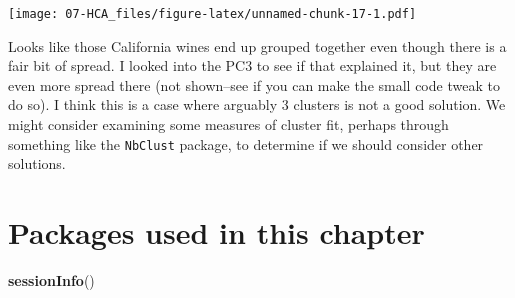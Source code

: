 \documentclass[
]{book}
\newenvironment{Shaded}{\begin{snugshade}}{\end{snugshade}}
\newcommand{\FunctionTok}[1]{\textcolor[rgb]{0.13,0.29,0.53}{\textbf{#1}}}
\newcommand{\NormalTok}[1]{#1}
\begin{document}
\texttt{[image: 07-HCA\_files/figure-latex/unnamed-chunk-17-1.pdf]}

Looks like those California wines end up grouped together even though there is a fair bit of spread. I looked into the PC3 to see if that explained it, but they are even more spread there (not shown--see if you can make the small code tweak to do so). I think this is a case where arguably 3 clusters is not a good solution. We might consider examining some measures of cluster fit, perhaps through something like the \texttt{NbClust} package, to determine if we should consider other solutions.

\section{Packages used in this chapter}\label{packages-used-in-this-chapter-6}

\begin{Shaded}
\begin{Highlighting}[]
\FunctionTok{sessionInfo}\NormalTok{()}
\end{Highlighting}
\end{Shaded}
\end{document}
